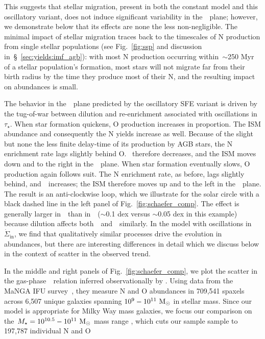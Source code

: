 \documentclass[ms.tex]{subfiles}
\begin{document}
This suggests that stellar migration, present in both the constant model and
this oscillatory variant, does not induce significant variability in
the~\ohno~plane; however, we demonstrate below that its effects are none the
less non-negligible.
The minimal impact of stellar migration traces back to the timescales of N
production from single stellar populations (see Fig.~\ref{fig:ssp} and
discussion in~\S~\ref{sec:yields:imf_agb}): with most N production occurring
within~$\sim$250 Myr of a stellar population's formation, most stars will not
migrate far from their birth radius by the time they produce most of their N,
and the resulting impact on abundances is small.
\par
The behavior in the~\ohno~plane predicted by the oscillatory SFE variant
is driven by the tug-of-war between dilution and re-enrichment
associated with oscillations in~$\tau_\star$.
When star formation quickens, O production increases in proportion.
The ISM abundance and consequently the N yields increase as well.
Because of the slight but none the less finite delay-time of its production by
AGB stars, the N enrichment rate lags slightly behind O.
\no~therefore decreases, and the ISM moves down and to the right in
the~\ohno~plane.
When star formation eventually slows, O production again follows suit.
The N enrichment rate, as before, lags slightly behind, and~\no~increases; the
ISM therefore moves up and to the left in the~\ohno~plane.
The result is an anti-clockwise loop, which we illustrate for the solar circle
with a black dashed line in the left panel of Fig.~\ref{fig:schaefer_comp}.
The effect is generally larger in~\oh~than in~\no~($\sim$0.1 dex versus
$\sim$0.05 dex in this example) because dilution affects
both~\oh~and~\nh~similarly.
In the model with oscillations in~$\dot{\Sigma}_\text{in}$, we find that
qualitatively similar processes drive the evolution in abundances, but there
are interesting differences in detail which we discuss below in the context of
scatter in the observed trend.
\par
In the middle and right panels of Fig.~\ref{fig:schaefer_comp}, we plot the
scatter in the gas-phase~\ohno~relation inferred observationally by
\citet{Schaefer2020}.
Using data from the MaNGA IFU survey~\citep{Bundy2015}, they measure N and O
abundances in 709,541 spaxels across 6,507 unique galaxies spanning
$10^9 - 10^{11}~\text{M}_\odot$ in stellar mass.
Since our model is appropriate for Milky Way mass galaxies, we focus our
comparison on the~$M_\star = 10^{10.5} - 10^{11}~\text{M}_\odot$ mass range
\citep{Licquia2015}, which cuts our sample sample to 197,787 individual N and O
\end{document}
